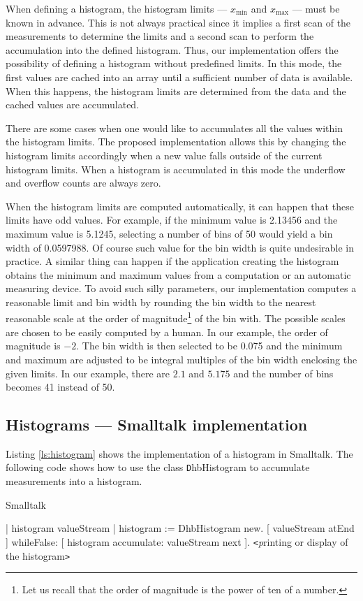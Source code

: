 When defining a histogram, the histogram limits --- $x_{\min}$ and
$x_{\max}$ --- must be known in advance. This is not always
practical since it implies a first scan of the measurements to
determine the limits and a second scan to perform the accumulation
into the defined histogram. Thus, our implementation offers the
possibility of defining a histogram without predefined limits. In
this mode, the first values are cached into an array until a
sufficient number of data is available. When this happens, the
histogram limits are determined from the data and the cached
values are accumulated.

There are some cases when one would like to accumulates all the
values within the histogram limits. The proposed implementation
allows this by changing the histogram limits accordingly when a
new value falls outside of the current histogram limits. When a
histogram is accumulated in this mode the underflow and overflow
counts are always zero.

When the histogram limits are computed automatically, it can
happen that these limits have odd values. For example, if the
minimum value is 2.13456 and the maximum value is 5.1245,
selecting a number of bins of 50 would yield a bin width of
0.0597988. Of course such value for the bin width is quite
undesirable in practice. A similar thing can happen if the
application creating the histogram obtains the minimum and maximum
values from a computation or an automatic measuring device. To
avoid such silly parameters, our implementation computes a
reasonable limit and bin width by rounding the bin width to the
nearest reasonable scale at the order of magnitude\footnote{Let us
recall that the order of magnitude is the power of ten of a
number.} of the bin with. The possible scales are chosen to be
easily computed by a human. In our example, the order of magnitude
is $-2$. The bin width is then selected to be 0.075 and the
minimum and maximum are adjusted to be integral multiples of the
bin width enclosing the given limits. In our example, there are
$2.1$ and $5.175$ and the number of bins becomes 41 instead of 50.

\subsection{Histograms --- Smalltalk implementation}
\label{sec:shistogram} Listing \ref{ls:histogram} shows the
implementation of a histogram in Smalltalk. The following code
shows how to use the class {\texttt DhbHistogram} to accumulate
measurements into a histogram.
\begin{displaycode}{Smalltalk}

 | histogram valueStream |
 histogram := DhbHistogram new.
 [ valueStream atEnd ]
        whileFalse: [ histogram accumulate: valueStream next ].
\hfil {\texttt<\textsl printing or display of the histogram\texttt >}\hfil
\end{displaycode}

